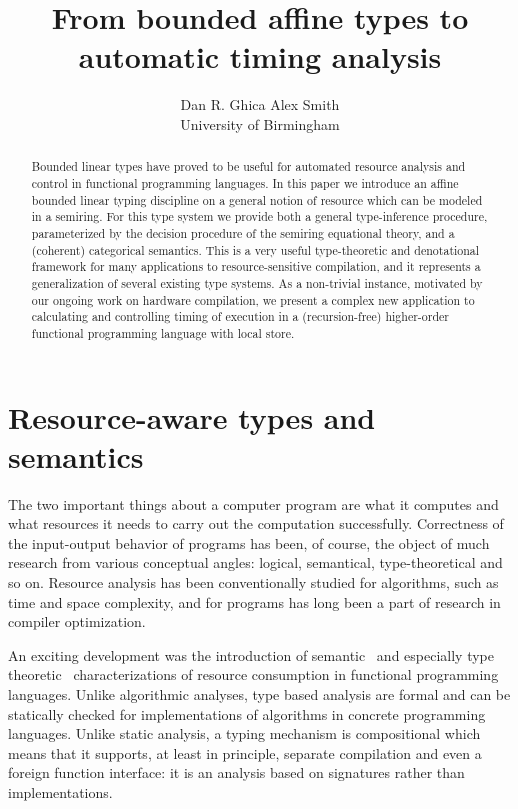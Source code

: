 \documentclass{article}
\begin{document}
\title{From bounded affine types to automatic timing analysis}
\author{
Dan R. Ghica \qquad Alex Smith\\
University of Birmingham
}
\maketitle
\begin{abstract}
Bounded linear types have proved to be useful for automated resource analysis and control in functional programming languages. In this paper we introduce an affine bounded linear typing discipline on a general notion of resource which can be modeled in a semiring. For this type system we provide both a general type-inference procedure, parameterized by the decision procedure of the semiring equational theory, and a (coherent) categorical semantics. This is a very useful type-theoretic and denotational framework for many applications to resource-sensitive compilation, and it represents a generalization of several existing type systems. As a non-trivial instance, motivated by our ongoing work on hardware compilation, we present a complex new application to calculating and controlling timing of execution in a (recursion-free) higher-order functional programming language with local store. 
\end{abstract}

\section{Resource-aware types and semantics}

The two important things about a computer program are what it computes and what resources it needs to carry out the computation successfully. Correctness of the input-output behavior of programs has been, of course, the object of much research from various conceptual angles: logical, semantical, type-theoretical and so on. Resource analysis has been conventionally studied for algorithms, such as time and space complexity, and for programs has long been a part of research in compiler optimization. 

An exciting development was the introduction of semantic~\cite{DBLP:conf/concur/Boudol93} and especially type theoretic~\cite{DBLP:conf/lics/Hofmann99a} characterizations of resource consumption in functional programming languages. Unlike algorithmic analyses, type based analysis are formal and can be statically checked for implementations of algorithms in concrete programming languages. Unlike static analysis, a typing mechanism is compositional which means that it supports, at least in principle, separate compilation and even a foreign function interface: it is an analysis based on signatures rather than implementations. 
\end{document}
